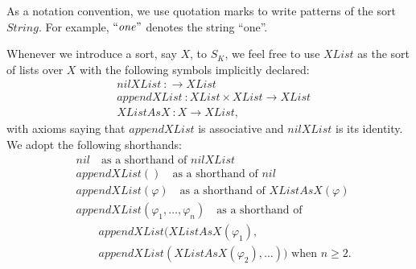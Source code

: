 \documentclass[UTF8]{article}
\theoremstyle{plain}
\theoremstyle{definition}
\theoremstyle{remark}
\begin{document}
As a notation convention, we use quotation marks to write patterns of the sort $\mathit{String}$. For example, $\mathit{``one"}$ denotes the string ``one''.

Whenever we introduce a sort, say $\mathit{X}$, to $S_K$, we feel free to 
use $\mathit{XList}$ as the sort of lists over $\mathit{X}$ 
with the following symbols implicitly declared:
\begin{align*}
&\mathit{nilXList} \ \colon \to \mathit{XList} \\
&\mathit{appendXList} \ \colon \mathit{XList} \times \mathit{XList} \to 
  \mathit{XList}\\
&\mathit{XListAsX} \ \colon \mathit{X} \to \mathit{XList},
\end{align*}
with axioms saying that $\mathit{appendXList}$ is associative and $\mathit{nilXList}$ is its identity.
We adopt the following shorthands:
\begin{align*}
&\mathit{nil}  \quad \text{as a shorthand of $\mathit{nilXList}$} \\
&\mathit{appendXList}()  \quad \text{as a shorthand of $\mathit{nil}$} \\
&\mathit{appendXList}(\varphi) \quad \text{as a shorthand of $\mathit{XListAsX}(\varphi)$}\\
&\mathit{appendXList}(\varphi_1,\dots,\varphi_n) \quad \text{as a shorthand of}\\ 
&\qquad \mathit{appendXList}(\mathit{XListAsX}(\varphi_1),\\
&\qquad appendXList(\mathit{XListAsX}(\varphi_2), \dots))
\text{ when $n\ge 2$.}
\end{align*}
\end{document}
